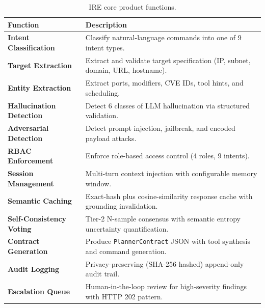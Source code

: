 ﻿\documentclass[10pt,journal,onecolumn]{IEEEtran}
\begin{document}
\begin{table}[t]
\caption{IRE core product functions.}
\label{tab:functions}
\begin{tabularx}{\textwidth}{l X}
\toprule
\textbf{Function} & \textbf{Description}\\
\midrule
\textbf{Intent Classification} & Classify natural-language commands into one of 9 intent types.\\
\textbf{Target Extraction} & Extract and validate target specification (IP, subnet, domain, URL, hostname).\\
\textbf{Entity Extraction} & Extract ports, modifiers, CVE IDs, tool hints, and scheduling.\\
\textbf{Hallucination Detection} & Detect 6 classes of LLM hallucination via structured validation.\\
\textbf{Adversarial Detection} & Detect prompt injection, jailbreak, and encoded payload attacks.\\
\textbf{RBAC Enforcement} & Enforce role-based access control (4 roles, 9 intents).\\
\textbf{Session Management} & Multi-turn context injection with configurable memory window.\\
\textbf{Semantic Caching} & Exact-hash plus cosine-similarity response cache with grounding invalidation.\\
\textbf{Self-Consistency Voting} & Tier-2 N-sample consensus with semantic entropy uncertainty quantification.\\
\textbf{Contract Generation} & Produce \texttt{PlannerContract} JSON with tool synthesis and command generation.\\
\textbf{Audit Logging} & Privacy-preserving (SHA-256 hashed) append-only audit trail.\\
\textbf{Escalation Queue} & Human-in-the-loop review for high-severity findings with HTTP 202 pattern.\\
\bottomrule
\end{tabularx}
\end{table}
\end{document}
